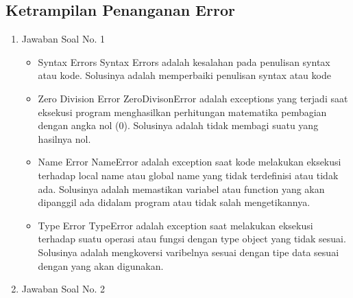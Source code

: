 \subsection{Ketrampilan Penanganan Error}
\begin{enumerate}
\item Jawaban Soal No. 1
\begin{itemize}
\item Syntax Errors
Syntax Errors adalah kesalahan pada penulisan syntax atau kode. Solusinya adalah memperbaiki penulisan syntax atau kode

\item Zero Division Error
ZeroDivisonError adalah exceptions yang terjadi saat eksekusi program menghasilkan perhitungan matematika pembagian dengan angka nol (0). Solusinya adalah tidak membagi suatu yang hasilnya nol.

\item Name Error
NameError adalah exception saat kode melakukan eksekusi terhadap local name atau global name yang tidak terdefinisi atau tidak ada. Solusinya adalah memastikan variabel atau function yang akan dipanggil ada didalam program atau tidak salah mengetikannya.

\item Type Error
TypeError adalah exception saat melakukan eksekusi terhadap suatu operasi atau fungsi dengan type object yang tidak sesuai. Solusinya adalah mengkoversi varibelnya sesuai dengan tipe data sesuai dengan yang akan digunakan.

\end{itemize}

\item Jawaban Soal No. 2																			

\end{enumerate}